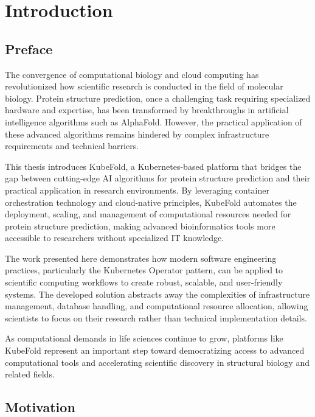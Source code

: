 

\chapter{Introduction}

\section{Preface}

The convergence of computational biology and cloud computing has revolutionized how scientific research is conducted in the field of molecular biology. Protein structure prediction, once a challenging task requiring specialized hardware and expertise, has been transformed by breakthroughs in artificial intelligence algorithms such as AlphaFold. However, the practical application of these advanced algorithms remains hindered by complex infrastructure requirements and technical barriers.

This thesis introduces KubeFold, a Kubernetes-based platform that bridges the gap between cutting-edge AI algorithms for protein structure prediction and their practical application in research environments. By leveraging container orchestration technology and cloud-native principles, KubeFold automates the deployment, scaling, and management of computational resources needed for protein structure prediction, making advanced bioinformatics tools more accessible to researchers without specialized IT knowledge.

The work presented here demonstrates how modern software engineering practices, particularly the Kubernetes Operator pattern, can be applied to scientific computing workflows to create robust, scalable, and user-friendly systems. The developed solution abstracts away the complexities of infrastructure management, database handling, and computational resource allocation, allowing scientists to focus on their research rather than technical implementation details.

As computational demands in life sciences continue to grow, platforms like KubeFold represent an important step toward democratizing access to advanced computational tools and accelerating scientific discovery in structural biology and related fields.


\section{Motivation}

